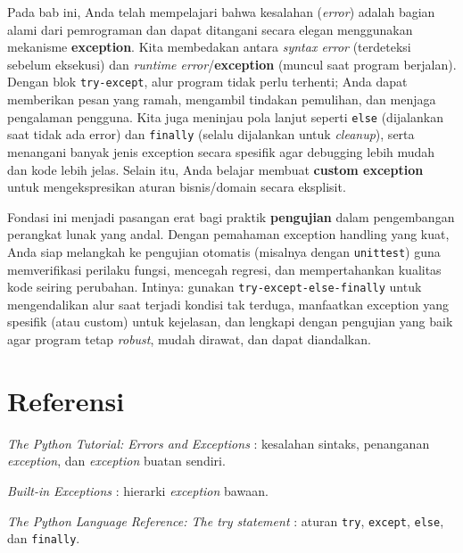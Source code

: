 Pada bab ini, Anda telah mempelajari bahwa kesalahan (\textit{error}) adalah bagian alami dari pemrograman dan dapat ditangani secara elegan menggunakan mekanisme \textbf{exception}. Kita membedakan antara \textit{syntax error} (terdeteksi sebelum eksekusi) dan \textit{runtime error}/\textbf{exception} (muncul saat program berjalan). Dengan blok \texttt{try-except}, alur program tidak perlu terhenti; Anda dapat memberikan pesan yang ramah, mengambil tindakan pemulihan, dan menjaga pengalaman pengguna. Kita juga meninjau pola lanjut seperti \texttt{else} (dijalankan saat tidak ada error) dan \texttt{finally} (selalu dijalankan untuk \textit{cleanup}), serta menangani banyak jenis exception secara spesifik agar debugging lebih mudah dan kode lebih jelas. Selain itu, Anda belajar membuat \textbf{custom exception} untuk mengekspresikan aturan bisnis/domain secara eksplisit.

Fondasi ini menjadi pasangan erat bagi praktik \textbf{pengujian} dalam pengembangan perangkat lunak yang andal. Dengan pemahaman exception handling yang kuat, Anda siap melangkah ke pengujian otomatis (misalnya dengan \texttt{unittest}) guna memverifikasi perilaku fungsi, mencegah regresi, dan mempertahankan kualitas kode seiring perubahan. Intinya: gunakan \texttt{try-except-else-finally} untuk mengendalikan alur saat terjadi kondisi tak terduga, manfaatkan exception yang spesifik (atau custom) untuk kejelasan, dan lengkapi dengan pengujian yang baik agar program tetap \textit{robust}, mudah dirawat, dan dapat diandalkan.

\section*{Referensi}
\begin{daftarrapat}
  \item \textit{The Python Tutorial: Errors and Exceptions} \cite{py-tut-errors}: kesalahan sintaks, penanganan \textit{exception}, dan \textit{exception} buatan sendiri.
  \item \textit{Built-in Exceptions} \cite{py-exceptions}: hierarki \textit{exception} bawaan.
  \item \textit{The Python Language Reference: The try statement} \cite{py-ref-try}: aturan \texttt{try}, \texttt{except}, \texttt{else}, dan \texttt{finally}.
\end{daftarrapat}
